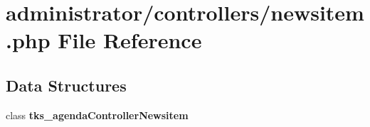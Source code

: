 \section{administrator/controllers/newsitem.php File Reference}
\label{administrator_2controllers_2newsitem_8php}
\subsection*{Data Structures}
\begin{DoxyCompactItemize}
\item 
class \textbf{ tks\+\_\+agenda\+Controller\+Newsitem}
\end{DoxyCompactItemize}

